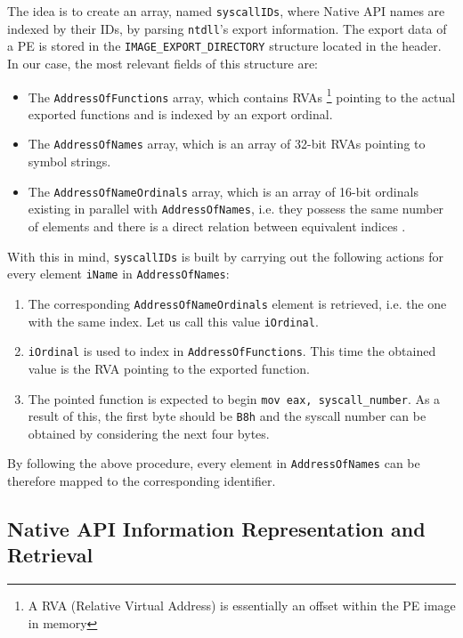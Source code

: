 The idea is to create an array, named \texttt{syscallIDs}, where Native API names are indexed by their IDs, by parsing \texttt{ntdll}'s export information. The export data of a PE is stored in the \texttt{IMAGE\_EXPORT\_DIRECTORY} structure located in the header. In our case, the most relevant fields of this structure are:

\begin{itemize}
\item The \texttt{AddressOfFunctions} array, which contains RVAs \footnote{A RVA (Relative Virtual Address) is essentially an offset within the PE image in memory} pointing to the actual exported functions and is indexed by an export ordinal.
\item The \texttt{AddressOfNames} array, which is an array of 32-bit RVAs pointing to symbol strings.
\item The \texttt{AddressOfNameOrdinals} array, which is an array of 16-bit ordinals existing in parallel with \texttt{AddressOfNames}, i.e. they possess the same number of elements and there is a direct relation between equivalent indices \cite{Sikorski:2012:PMA:2181153}.  
\end{itemize}

\newpage

With this in mind, \texttt{syscallIDs} is built by carrying out the following actions for every element \texttt{iName} in \texttt{AddressOfNames}:

\begin{enumerate}
\item The corresponding \texttt{AddressOfNameOrdinals} element is retrieved, i.e. the one with the same index. Let us call this value \texttt{iOrdinal}.
\item \texttt{iOrdinal} is used to index in \texttt{AddressOfFunctions}. This time the obtained value is the RVA pointing to the exported function.
\item The pointed function is expected to begin \texttt{mov eax, syscall\_number}. As a result of this, the first byte should be \texttt{B8h} and the syscall number can be obtained by considering the next four bytes.  
\end{enumerate}

By following the above procedure, every element in \texttt{AddressOfNames} can be therefore mapped to the corresponding identifier. 

\subsection{Native API Information Representation and Retrieval}

